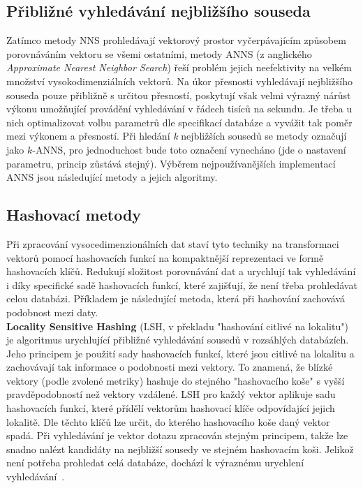 \subsection{Přibližné vyhledávání nejbližšího souseda}
\label{anns}
Zatímco metody NNS prohledávají vektorový prostor vyčerpávajícím způsobem porovnáváním vektoru se všemi ostatními, metody ANNS (z anglického \textit{Approximate Nearest Neighbor Search}) řeší problém jejich neefektivity na velkém množství vysokodimenziálních vektorů. Na úkor přesnosti vyhledávají nejbližšího souseda pouze přibližně s určitou přesností, poskytují však velmi výrazný nárůst výkonu umožňující provádění vyhledávání v řádech tisíců na sekundu. Je třeba u nich optimalizovat volbu parametrů dle specifikací databáze a vyvážit tak poměr mezi výkonem a přesností. Při hledání \textit{k} nejbližších sousedů se metody označují jako $k$-ANNS, pro jednoduchost bude toto označení vynecháno (jde o nastavení parametru, princip zůstává stejný). Výběrem nejpoužívanějších implementací ANNS jsou následující metody a jejich algoritmy.

\subsection{Hashovací metody}
Při zpracování vysocedimenzionálních dat staví tyto techniky na transformaci vektorů pomocí hashovacích funkcí na kompaktnější reprezentaci ve formě hashovacích klíčů. Redukují složitost porovnávání dat a urychlují tak vyhledávání i díky specifické sadě hashovacích funkcí, které zajišťují, že není třeba prohledávat celou databázi. Příkladem je následující metoda, která při hashování zachovává podobnost mezi daty. \\

\textbf{Locality Sensitive Hashing} (LSH, v překladu "hashování citlivé na lokalitu") je algoritmus urychlující přibližné vyhledávání sousedů v rozsáhlých databázích. Jeho principem je použití sady hashovacích funkcí, které jsou citlivé na lokalitu a zachovávají tak informace o podobnosti mezi vektory. To znamená, že blízké vektory (podle zvolené metriky) hashuje do stejného "hashovacího koše" s vyšší pravděpodobností než vektory vzdálené. LSH pro každý vektor aplikuje sadu hashovacích funkcí, které přídělí vektorům hashovací klíče odpovídající jejich lokalitě. Dle těchto klíčů lze určit, do kterého hashovacího koše daný vektor spadá. Při vyhledávání je vektor dotazu zpracován stejným principem, takže lze snadno nalézt kandidáty na nejbližší sousedy ve stejném hashovacím koši. Jelikož není potřeba prohledat celá databáze, dochází k výraznému urychlení vyhledávání~\cite{tlsh, lsh}.

